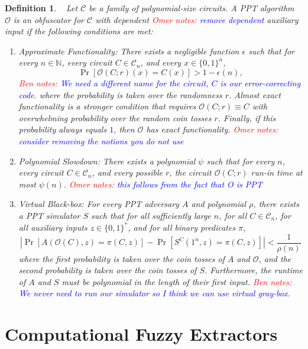 \documentclass[11pt]{article}
\newcommand{\zo}{\ensuremath{\{0, 1\}}}
\newtheorem{definition}[theorem]{Definition}
\newcommand{\authnote}[2]{{\textcolor{red}{\textsf{#1 notes: }\textcolor{blue}{ #2}}\marginpar{\textcolor{red}{\textbf{!!!!!}}}}}
\newcommand{\authnote}[2]{}
\newcommand{\bnote}[1]{{\authnote{Ben}{#1}}}
\newcommand{\onote}[1]{{\authnote{Omer}{#1}}}
\begin{document}
\begin{definition}~\cite{barak2001possibility, goldwasser2005impossibility}
\label{def:obf} Let $\mathcal{C}$ be a family of polynomial-size circuits.  A PPT algorithm $\mathcal{O}$ is an obfuscator for $\mathcal{C}$ with dependent \onote{remove dependent} auxiliary input if the following conditions are met:
\begin{enumerate}
\item \emph{Approximate Functionality:}  There exists a negligible function $\epsilon$ such that for every $n\in \mathbb{N}$, every circuit $C\in \mathcal{C}_n$, and every $x\in\zo^n$,
\[
\Pr[\mathcal{O}(C; r)(x) = C(x)] > 1-\epsilon(n),
\]
\bnote{We need a different name for the circuit, $C$ is our error-correcting code.}
where the probability is taken over the randomness $r$.  \emph{Almost exact functionality} is a stronger condition that requires $\mathcal{O}(C;r)\equiv C$ with overwhelming probability over the random coin tosses $r$.  Finally, if this probability always equals $1$, then $\mathcal{O}$ has \emph{exact functionality}. \onote{consider removing the notions you do not use}
\item \emph{Polynomial Slowdown:}  There exists a polynomial $\psi$ such that for every $n$, every circuit $C\in \mathcal{C}_n$, and every possible $r$, the circuit $\mathcal{O}(C; r)$ run-in time at most $\psi(n)$. \onote{this follows from the fact that O is PPT}
\item \emph{Virtual Black-box:}  For every PPT adversary $A$ and polynomial $\rho$, there exists a PPT simulator $S$ such that for all sufficiently large $n$, for all $C\in \mathcal{C}_n$, for all auxiliary inputs $z\in \zo^*$,
and for all binary predicates $\pi$,
\[
|\Pr[A(\mathcal{O}(C), z) = \pi(C, z)] - \Pr[S^C(1^n, z) = \pi(C, z)] | < \frac{1}{\rho(n)}
\]
where the first probability is taken over the coin tosses of $A$ and $\mathcal{O}$, and the second probability is taken over the coin tosses of $S$.  Furthermore, the runtime of $A$ and $S$ must be polynomial in the length of their first input.
\bnote{We never need to run our simulator so I think we can use virtual gray-box.}
\end{enumerate}
\end{definition}


\section{Computational Fuzzy Extractors}
\label{sec:fuzzy extractors}
\end{document}

